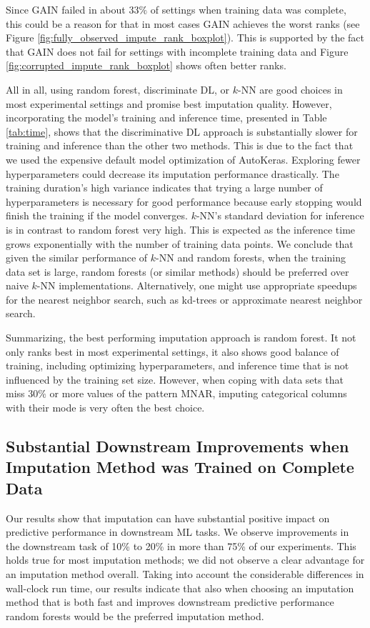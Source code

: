 Since GAIN failed in about $33\%$ of settings when training data was complete, this could be a reason for that in most cases GAIN achieves the worst ranks (see Figure \ref{fig:fully_observed_impute_rank_boxplot}). This is supported by the fact that GAIN does not fail for settings with incomplete training data and Figure \ref{fig:corrupted_impute_rank_boxplot} shows often better ranks.

All in all, using random forest, discriminate DL, or $k$-NN are good choices in most experimental settings and promise best imputation quality. However, incorporating the model's training and inference time, presented in Table \ref{tab:time}, shows that the discriminative DL approach is substantially slower for training and inference than the other two methods. This is due to the fact that we used the expensive default model optimization of AutoKeras. Exploring fewer hyperparameters could decrease its imputation performance drastically. The training duration's high variance indicates that trying a large number of hyperparameters is necessary for good performance because early stopping would finish the training if the model converges. $k$-NN's standard deviation for inference is in contrast to random forest very high. This is expected as the inference time grows exponentially with the number of training data points. We conclude that given the similar performance of $k$-NN and random forests, when the training data set is large, random forests (or similar methods) should be preferred over naive $k$-NN implementations. Alternatively, one might use appropriate speedups for the nearest neighbor search, such as kd-trees or approximate nearest neighbor search.

Summarizing, the best performing imputation approach is random forest. It not only ranks best in most experimental settings, it also shows good balance of training, including optimizing hyperparameters, and inference time that is not influenced by the training set size. However, when coping with data sets that miss $30\%$ or more values of the pattern MNAR, imputing categorical columns with their mode is very often the best choice.


\subsection{Substantial Downstream Improvements when Imputation Method was Trained on Complete Data}
%
Our results show that imputation can have substantial positive impact on predictive performance in downstream ML tasks. We observe improvements in the downstream task of 10\% to 20\% in more than 75\% of our experiments. This holds true for most imputation methods; we did not observe a clear advantage for an imputation method overall. Taking into account the considerable differences in wall-clock run time, our results indicate that also when choosing an imputation method that is both fast and improves downstream predictive performance random forests would be the preferred imputation method.

